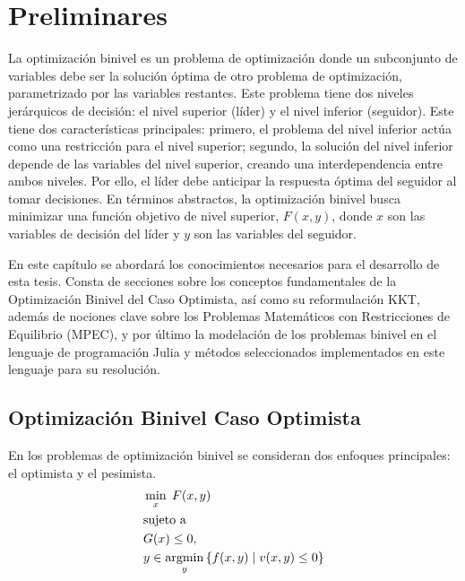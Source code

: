 \chapter{Preliminares}


La optimización binivel es un problema de optimización donde un subconjunto de variables debe ser la solución óptima de otro problema de optimización, parametrizado por las variables restantes. Este problema tiene dos niveles jerárquicos de decisión: el nivel superior (líder) y el nivel inferior (seguidor).
Este tiene dos características principales: primero, el problema del nivel inferior actúa como una restricción para el nivel superior; segundo, la solución del nivel inferior depende de las variables del nivel superior, creando una interdependencia entre ambos niveles. Por ello, el líder debe anticipar la respuesta óptima del seguidor al tomar decisiones.
En términos abstractos, la optimización binivel busca minimizar una función objetivo de nivel superior, $F(x, y)$, donde $x$ son las variables de decisión del líder y $y$ son las variables del seguidor. 

En este capítulo se abordará los conocimientos necesarios para el desarrollo de esta tesis. Consta de secciones sobre los conceptos fundamentales de la Optimización Binivel del Caso Optimista, así como su reformulación KKT,
además de nociones clave sobre los Problemas Matemáticos con Restricciones de Equilibrio (MPEC), 
y por último la modelación de los problemas binivel en el lenguaje de programación Julia y métodos seleccionados implementados en este lenguaje para su resolución. 

\section{Optimización Binivel Caso Optimista}

En los problemas de optimización binivel se consideran dos enfoques principales: el optimista y el pesimista. 
\begin{equation}
\begin{aligned}
& \min_{x} \; F(x, y) \\
& \text{sujeto a } \\
& G(x) \leq 0, \\
& y \in \operatorname*{argmin}_{y} \left\{ f(x, y) \mid v(x, y) \leq 0 \right\}
\end{aligned}
\label{eq:ProblemaGeneral}
\end{equation}

